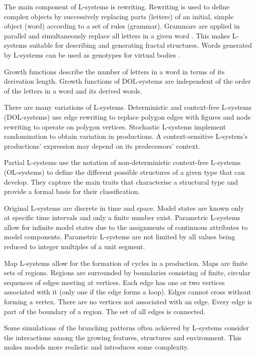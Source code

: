 The main component of L-systems is rewriting. Rewriting is used to define complex objects by successively replacing parts (letters) of an initial, simple object (word) according to a set of rules (grammar). Grammars are applied in parallel and simultaneously replace all letters in a given word \cite{Prusinkiewicz2004}. This makes L-systems suitable for describing and generating fractal structures. Words generated by L-systems can be used as genotypes for virtual bodies \cite{Kolodziej2002}.

Growth functions describe the number of letters in a word in terms of its derivation length. Growth functions of DOL-systems are independent of the order of the letters in a word and its derived words. \cite{Prusinkiewicz2004}

There are many variations of L-systems. Deterministic and context-free L-systems (DOL-systems) use edge rewriting to replace polygon edges with figures and node rewriting to operate on polygon vertices. Stochastic L-systems implement randomization to obtain variation in productions. A context-sensitive L-system's productions' expression may depend on its predecessors' context.  \cite{Prusinkiewicz2004}

Partial L-systems use the notation of non-deterministic context-free L-systems (OL-systems) to define the different possible structures of a given type that can develop. They capture the main traits that characterise a structural type and provide a formal basis for their classification. \cite{Prusinkiewicz2004}

Original L-systems are discrete in time and space. Model states are known only at specific time intervals and only a finite number exist. Parametric L-systems allow for infinite model states due to the assignments of continuous attributes to model components. Parametric L-systems are not limited by all values being reduced to integer multiples of a unit segment. \cite{Prusinkiewicz2004}

Map L-systems allow for the formation of cycles in a production. Maps are finite sets of regions. Regions are surrounded by boundaries consisting of finite, circular sequences of edges meeting at vertices. Each edge has one or two vertices associated with it (only one if the edge forms a loop). Edges cannot cross without forming a vertex. There are no vertices not associated with an edge. Every edge is part of the boundary of a region. The set of all edges is connected. \cite{Prusinkiewicz2004}

Some simulations of the branching patterns often achieved by L-systems consider the interactions among the growing features, structures and environment. This makes models more realistic and introduces some complexity. \cite{Prusinkiewicz2004}

